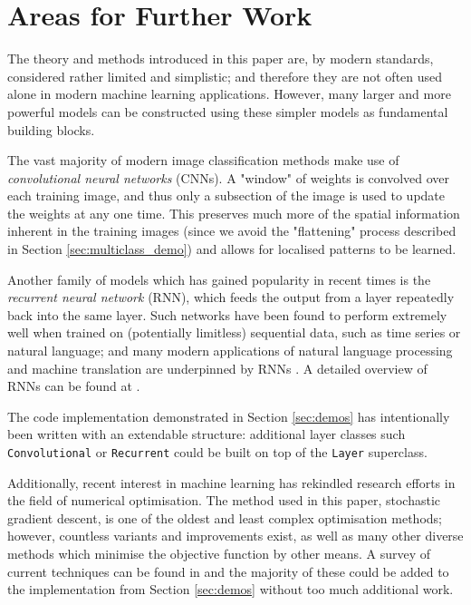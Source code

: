 \documentclass{article}[11pt]
\begin{document}
\section{Areas for Further Work}

    The theory and methods introduced in this paper are, by modern standards, considered rather limited and simplistic; and therefore they are not often used alone in modern machine learning applications. However, many larger and more powerful models can be constructed using these simpler models as fundamental building blocks.
    
    The vast majority of modern image classification methods make use of \textit{convolutional neural networks} (CNNs). A "window" of weights is convolved over each training image, and thus only a subsection of the image is used to update the weights at any one time. This preserves much more of the spatial information inherent in the training images (since we avoid the "flattening" process described in Section \ref{sec:multiclass_demo}) and allows for localised patterns to be learned.
    
    Another family of models which has gained popularity in recent times is the \textit{recurrent neural network} (RNN), which feeds the output from a layer repeatedly back into the same layer. Such networks have been found to perform extremely well when trained on (potentially limitless) sequential data, such as time series or natural language; and many modern applications of natural language processing and machine translation are underpinned by RNNs \cite{google_nmt}. A detailed overview of RNNs can be found at \cite{kaparthy_rnns}.
    
    The code implementation demonstrated in Section \ref{sec:demos} has intentionally been written with an extendable structure: additional layer classes such \texttt{Convolutional} or \texttt{Recurrent} could be built on top of the \texttt{Layer} superclass.
    
    Additionally, recent interest in machine learning has rekindled research efforts in the field of numerical optimisation. The method used in this paper, stochastic gradient descent, is one of the oldest and least complex optimisation methods; however, countless variants and improvements exist, as well as many other diverse methods which minimise the objective function by other means. A survey of current techniques can be found in \cite{optimisation} and the majority of these could be added to the implementation from Section \ref{sec:demos} without too much additional work.
    



\end{document}
